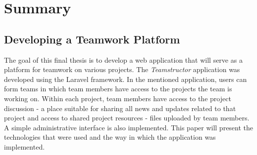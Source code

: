 \section*{Summary}
\subsection*{Developing a Teamwork Platform}
The goal of this final thesis is to develop a web application that will serve as a platform for teamwork on various projects. The \textit{Teamstructor} application was developed using the Laravel framework. In the mentioned application, users can form teams in which team members have access to the projects the team is working on. Within each project, team members have access to the project discussion - a place suitable for sharing all news and updates related to that project and access to shared project resources - files uploaded by team members. A simple administrative interface is also implemented. This paper will present the technologies that were used and the way in which the application was implemented.
